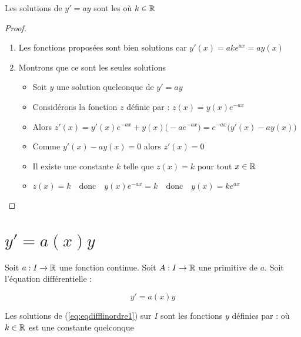 \begin{frame}
\begin{theoreme}
Les solutions de $y' = a y$ sont les 
où $k\in \mathbb{R}$
\end{theoreme}
\begin{proof}
\pause
{\small\begin{enumerate}
  \item Les fonctions proposées sont bien solutions car $y'(x) = ake^{ax} = a y(x)$
 \pause 
  \item Montrons que ce sont les seules solutions
  \pause
  \begin{itemize}[<+->]
    \item Soit $y$ une solution quelconque de $y' = a y$
    
    \item Considérons la fonction $z$ définie par : $z(x) = y(x) e^{-ax}$
    
    \item Alors 
    $z'(x) = y'(x)e^{-ax} +  y(x)\big(-ae^{-ax}\big) =  e^{-ax}\big(y'(x)-ay(x)\big)$
    
    \item Comme $y'(x) - ay(x) = 0$ alors $z'(x) = 0$
    
    \item Il existe une constante $k$ telle que $z(x)=k$ pour tout $x\in \mathbb{R}$
 
    \item $z(x)= k \quad\text{donc}\quad  y(x) e^{-ax} = k \quad\text{donc}\quad  
  y(x) = ke^{ax}$
   \qedhere 
  \end{itemize}
 
\end{enumerate}
 }  
  
\end{proof}
\end{frame}



\section*{$y'=a(x)y$}

\begin{frame}

\begin{theoreme}
\label{th:eqdifflinordre1}
Soit $a : I \to \mathbb{R}$ une fonction continue. Soit $A : I \to \mathbb{R}$ une primitive de $a$.
Soit l'équation différentielle :

\vspace*{-2ex}
\begin{equation}
   y' = a(x) y   
  \label{eq:eqdifflinordre1}
  \tag{$E$}
\end{equation}
\vspace*{-2ex}
\pause

Les solutions de (\ref{eq:eqdifflinordre1}) sur $I$ sont les fonctions $y$ définies par :
\vspace*{-2ex}
où $k\in \mathbb{R}$ est une constante quelconque
\end{theoreme} 
\end{frame}


